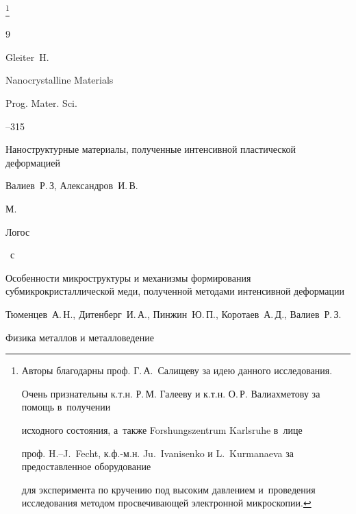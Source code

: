 {\thanks{Авторы благодарны проф. Г.\,А.~Салищеву за идею данного исследования.

Очень признательны к.т.н. Р.\,М. Галееву и к.т.н. О.\,Р. Валиахметову за помощь в~получении

исходного состояния, а~также Forshungszentrum Karlsruhe в~лице

проф. H.--J.~Fecht,  \mbox{к.ф.-м.н.} Ju.~Ivanisenko и L.~Kurmanaeva  за предоставленное оборудование

для эксперимента по кручению под высоким давлением и~проведения исследования методом просвечивающей электронной микроскопии.}}







\begin{thebibliography}{9}




\by Gleiter~H.

\paper Nanocrystalline Materials

\jour Prog. Mater. Sci.




--315






\book Наноструктурные материалы, полученные интенсивной пластической деформацией

\by Валиев~Р.\,З, Александров~И.\,В.

\publaddr М.

\publ Логос


~с






\paper Особенности микроструктуры и механизмы формирования субмикрокристаллической меди, полученной методами интенсивной деформации

\by Тюменцев~А.\,Н., Дитенберг~И.\,А., Пинжин~Ю.\,П., Коротаев~А.\,Д., Валиев~Р.\,З.

\jour Физика металлов и металловедение





\end{thebibliography}
